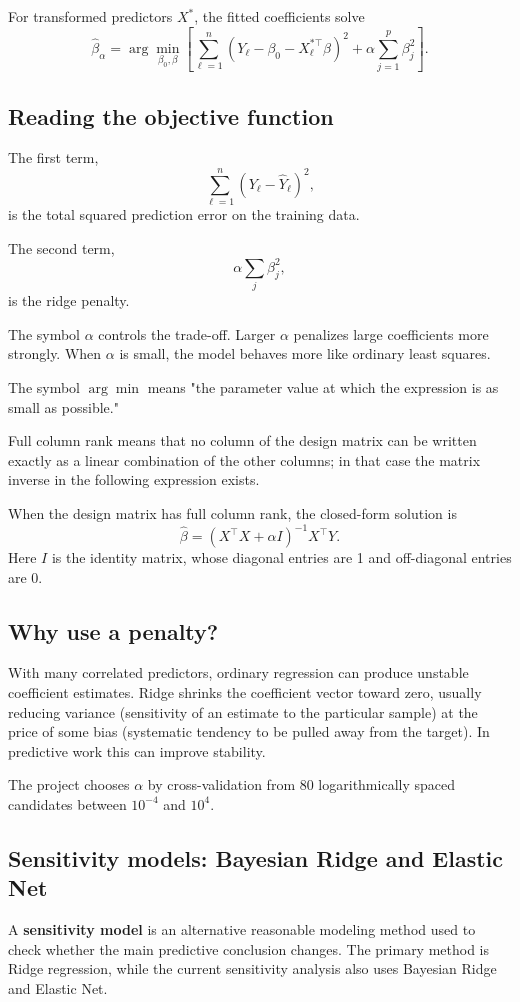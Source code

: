 \documentclass[11pt]{article}
\begin{document}
For transformed predictors $X^*$, the fitted coefficients solve
\[
\boxed{
\hat\beta_{\alpha}=\arg\min_{\beta_0,\beta}
\left[
\sum_{\ell=1}^n
\left(Y_\ell-\beta_0-X_\ell^{*\top}\beta\right)^2
+\alpha\sum_{j=1}^p\beta_j^2
\right].
}
\]

\subsection{Reading the objective function}
The first term,
\[
\sum_{\ell=1}^n(Y_\ell-\hat Y_\ell)^2,
\]
is the total squared prediction error on the training data.

The second term,
\[
\alpha\sum_j\beta_j^2,
\]
is the ridge penalty.

The symbol $\alpha$ controls the trade-off. Larger $\alpha$ penalizes large coefficients more strongly. When $\alpha$ is small, the model behaves more like ordinary least squares.

The symbol $\arg\min$ means "the parameter value at which the expression is as small as possible."

Full column rank means that no column of the design matrix can be written exactly as a linear combination of the other columns; in that case the matrix inverse in the following expression exists.\par

When the design matrix has full column rank, the closed-form solution is
\[
\boxed{\hat\beta=(X^\top X+\alpha I)^{-1}X^\top Y.}
\]
Here $I$ is the identity matrix, whose diagonal entries are 1 and off-diagonal entries are 0.

\subsection{Why use a penalty?}
With many correlated predictors, ordinary regression can produce unstable coefficient estimates. Ridge shrinks the coefficient vector toward zero, usually reducing variance (sensitivity of an estimate to the particular sample) at the price of some bias (systematic tendency to be pulled away from the target). In predictive work this can improve stability.

The project chooses $\alpha$ by cross-validation from 80 logarithmically spaced candidates between $10^{-4}$ and $10^4$.

\subsection{Sensitivity models: Bayesian Ridge and Elastic Net}
A \textbf{sensitivity model} is an alternative reasonable modeling method used to check whether the main predictive conclusion changes. The primary method is Ridge regression, while the current sensitivity analysis also uses Bayesian Ridge and Elastic Net.
\end{document}

